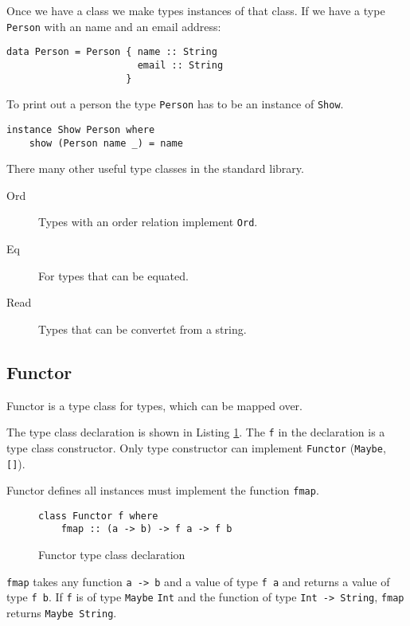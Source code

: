 \documentclass[twoside, a4paper]{article}
\begin{document}
Once we have a class we make types instances of that class. If we have a type \verb|Person| with an name and an email address:
\begin{verbatim}
data Person = Person { name :: String
                       email :: String
                     }
\end{verbatim}

To print out a person the type \verb|Person| has to be an instance of \verb|Show|.

\begin{verbatim}
instance Show Person where
    show (Person name _) = name
\end{verbatim}

There many other useful type classes in the standard library.

\begin{description}
\item[Ord] Types with an order relation implement \verb|Ord|.
\item[Eq] For types that can be equated.
\item[Read] Types that can be convertet from a string.
\end{description}

\subsection{Functor}
\label{sec:functor}

Functor is a type class for types, which can be mapped over. 

The type class declaration is shown in Listing \ref{fig:functordeclaration}.
The \verb|f| in the declaration is a type class constructor. Only type constructor can implement \verb|Functor| (\verb|Maybe|, \verb|[]|).

Functor defines all instances must implement the function \verb|fmap|.
\begin{figure}
  \centering
\begin{verbatim}
class Functor f where
    fmap :: (a -> b) -> f a -> f b
\end{verbatim}
  \caption{Functor type class declaration}
  \label{fig:functordeclaration}
\end{figure}

\verb|fmap| takes any function \verb|a -> b| and a value of type \verb|f a| and returns a value of type \verb|f b|. 
If \verb|f| is of type \verb|Maybe| \verb|Int| and the function of type \verb|Int -> String|, \verb|fmap| returns \verb|Maybe String|. 
\end{document}
